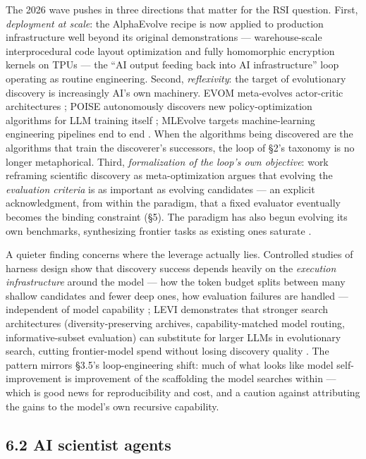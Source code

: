\documentclass[
  11pt,
]{article}
\begin{document}
The 2026 wave pushes in three directions that matter for the RSI
question. First, \emph{deployment at scale}: the AlphaEvolve recipe is
now applied to production infrastructure well beyond its original
demonstrations --- warehouse-scale interprocedural code layout
optimization \citep{ananda2026ai} and fully homomorphic encryption
kernels on TPUs \citep{gorantala2026adapting} --- the ``AI output
feeding back into AI infrastructure'' loop operating as routine
engineering. Second, \emph{reflexivity}: the target of evolutionary
discovery is increasingly AI's own machinery. EVOM meta-evolves
actor-critic architectures \citep{zhang2026evom}; POISE autonomously
discovers new policy-optimization algorithms for LLM training itself
\citep{xia2026ai}; MLEvolve targets machine-learning engineering
pipelines end to end \citep{du2026mlevolve}. When the algorithms being
discovered are the algorithms that train the discoverer's successors,
the loop of §2's taxonomy is no longer metaphorical. Third,
\emph{formalization of the loop's own objective}: work reframing
scientific discovery as meta-optimization argues that evolving the
\emph{evaluation criteria} is as important as evolving candidates
\citep{zhang2026scientific} --- an explicit acknowledgment, from within
the paradigm, that a fixed evaluator eventually becomes the binding
constraint (§5). The paradigm has also begun evolving its own
benchmarks, synthesizing frontier tasks as existing ones saturate
\citep{wu2026benchevolver}.

A quieter finding concerns where the leverage actually lies. Controlled
studies of harness design show that discovery success depends heavily on
the \emph{execution infrastructure} around the model --- how the token
budget splits between many shallow candidates and fewer deep ones, how
evaluation failures are handled --- independent of model capability
\citep{ishibashi2026effective}; LEVI demonstrates that stronger search
architectures (diversity-preserving archives, capability-matched model
routing, informative-subset evaluation) can substitute for larger LLMs
in evolutionary search, cutting frontier-model spend without losing
discovery quality \citep{tanveer2026levi}. The pattern mirrors §3.5's
loop-engineering shift: much of what looks like model self-improvement
is improvement of the scaffolding the model searches within --- which is
good news for reproducibility and cost, and a caution against
attributing the gains to the model's own recursive capability.

\subsection{6.2 AI scientist agents}\label{ai-scientist-agents}
\end{document}
